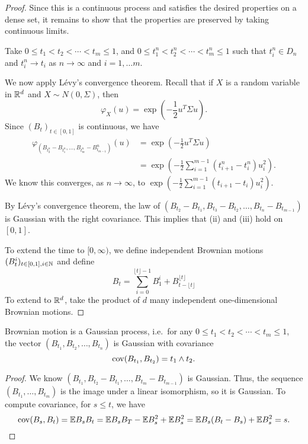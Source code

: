 \documentclass[a4paper]{article}
\begin{document}
\begin{proof}
  Since this is a continuous process and satisfies the desired properties on a dense set, it remains to show that the properties are preserved by taking continuous limits.

  Take $0 \leq t_1 < t_2 < \cdots < t_m \leq 1$, and $0 \leq t_1^n < t_2^n < \cdots < t_m^n \leq 1$ such that $t_i^n \in D_n$ and $t_i^n \to t_i$ as $n \to \infty$ and $i = 1, \ldots m$.

  We now apply L\'evy's convergence theorem. Recall that if $X$ is a random variable in $\mathbb{R}^d$ and $X \sim N(0, \Sigma)$, then
  \[
    \varphi_X (u) = \exp\left(-\frac{1}{2} u^T \Sigma u\right).
  \]
  Since $(B_t)_{t \in [0, 1]}$ is continuous, we have
  \begin{align*}
    \varphi_{(B_{t_2^n} - B_{t_1^n}, \ldots, B_{t_m^n} - B_{t_{m - 1}}^n)}(u) &= \exp \left(- \frac{1}{2} u^T \Sigma u\right)\\
    &= \exp \left(-\frac{1}{2} \sum_{i = 1}^{m - 1} (t_{i + 1}^n - t_i^n) u_i^2\right).
  \end{align*}
  We know this converges, as $n \to \infty$, to $\exp \left(-\frac{1}{2} \sum_{i = 1}^{m - 1} (t_{i + 1} - t_i) u_i^2\right)$.

  By L\'evy's convergence theorem, the law of $(B_{t_2} - B_{t_1}, B_{t_3} - B_{t_2}, \ldots, B_{t_n} - B_{t_{m - 1}})$ is Gaussian with the right covariance. This implies that (ii) and (iii) hold on $[0, 1]$.

  To extend the time to $[0, \infty)$, we define independent Brownian motions $(B_t^i)_{t \in [0, 1], i \in \mathbb{N}}$ and define
  \[
    B_t = \sum_{i = 0}^{\lfloor t\rfloor - 1} B_1^i + B^{\lfloor t\rfloor}_{t - \lfloor t \rfloor}
  \]
  To extend to $\mathbb{R}^d$, take the product of $d$ many independent one-dimensional Brownian motions.
\end{proof}

\begin{lemma}
  Brownian motion is a Gaussian process, i.e.\ for any $0 \leq t_1 < t_2 < \cdots < t_m \leq 1$, the vector $(B_{t_1}, B_{t_2}, \ldots, B_{t_n})$ is Gaussian with covariance
  \[
    \operatorname{cov}(B_{t_1}, B_{t_2}) = t_1 \wedge t_2.
  \]
\end{lemma}

\begin{proof}
  We know $(B_{t_1}, B_{t_2} - B_{t_1}, \ldots, B_{t_m} - B_{t_{m - 1}})$ is Gaussian. Thus, the sequence $(B_{t_1}, \ldots, B_{t_m})$ is the image under a linear isomorphism, so it is Gaussian. To compute covariance, for $s \leq t$, we have
  \[
    \operatorname{cov}(B_s, B_t) = \mathbb{E} B_s B_t = \mathbb{E} B_s B_T - \mathbb{E} B_s^2 + \mathbb{E} B_s^2 = \mathbb{E} B_s(B_t - B_s) + \mathbb{E} B_s^2 = s.\qedhere
  \]
\end{proof}
\end{document}
